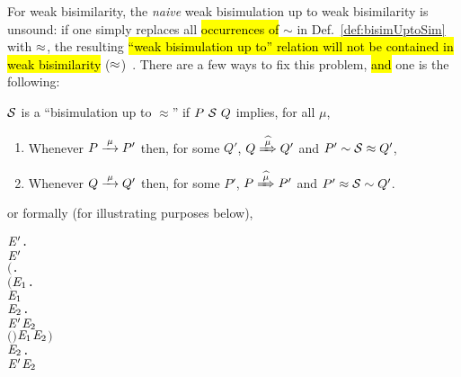 For weak bisimilarity, the \emph{naive} weak bisimulation up to weak bisimilarity
is unsound: if one simply replaces all \hl{occurrences of} $\sim$ in
Def.~\ref{def:bisimUptoSim} with $\wb$, the resulting
\hl{``weak bisimulation up to'' relation will not be contained in weak
  bisimilarity} ($\wb$)~\cite{sangiorgi1992problem}.
There are a few ways to fix this problem, \hl{and} one is the following:
%
\begin{definition}%
  $\S$ is a ``bisimulation up to $\approx$'' if
  $P\ \S\ Q$ implies, for all $\mu$,
\begin{enumerate}
\item Whenever $P \arr{\mu} P'$ then, for some
  $Q'$, $Q \Arcap{\mu} Q'$ and $P' \sim \S \approx Q'$,
\item Whenever $Q \arr{\mu} Q'$ then, for some
  $P'$, $P \Arcap{\mu} P'$ and $P' \approx \S \sim Q'$.
\end{enumerate}
or formally (for illustrating purposes below),
\begin{alltt}
      \HOLTokenDefEquality{}
      \HOLSymConst{\HOLTokenForall{}} \ensuremath{\HOLBoundVar{E}\sp{\prime}}.
            \ensuremath{\HOLBoundVar{E}\sp{\prime}} \HOLSymConst{\HOLTokenImp{}}
          \ensuremath{(}\HOLSymConst{\HOLTokenForall{}}.
               \ensuremath{(}\HOLSymConst{\HOLTokenForall{}}\ensuremath{\HOLBoundVar{E}\sb{\mathrm{1}}}.
                     \HOLTokenTransBegin{} \HOLTokenTransEnd \ensuremath{\HOLBoundVar{E}\sb{\mathrm{1}}} \HOLSymConst{\HOLTokenImp{}}
                    \HOLSymConst{\HOLTokenExists{}}\ensuremath{\HOLBoundVar{E}\sb{\mathrm{2}}}.
                        \ensuremath{\HOLBoundVar{E}\sp{\prime}} \HOLTokenWeakTransBegin{} \HOLTokenWeakTransEnd \ensuremath{\HOLBoundVar{E}\sb{\mathrm{2}}} \HOLSymConst{\HOLTokenConj{}}
                        \ensuremath{(} \HOLSymConst{\HOLTokenRCompose{}}  \HOLSymConst{\HOLTokenRCompose{}} \ensuremath{)} \ensuremath{\HOLBoundVar{E}\sb{\mathrm{1}}} \ensuremath{\HOLBoundVar{E}\sb{\mathrm{2}}}\ensuremath{)} \HOLSymConst{\HOLTokenConj{}}
               \HOLSymConst{\HOLTokenForall{}}\ensuremath{\HOLBoundVar{E}\sb{\mathrm{2}}}.
                   \ensuremath{\HOLBoundVar{E}\sp{\prime}} \HOLTokenTransBegin{} \HOLTokenTransEnd \ensuremath{\HOLBoundVar{E}\sb{\mathrm{2}}} \HOLSymConst{\HOLTokenImp{}}

\end{alltt}
\end{definition}
